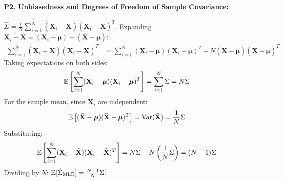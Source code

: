 \paragraph{P2. Unbiasedness and Degrees of Freedom of Sample Covariance:}
$\hat{\Sigma} = \frac{1}{N}\sum_{i=1}^N (\mathbf{X}_i - \bar{\mathbf{X}})(\mathbf{X}_i - \bar{\mathbf{X}})^T$.
Expanding $\mathbf{X}_i - \bar{\mathbf{X}} = (\mathbf{X}_i - \boldsymbol{\mu}) - (\bar{\mathbf{X}} - \boldsymbol{\mu})$:
\begin{align*}
\sum_{i=1}^N (\mathbf{X}_i - \bar{\mathbf{X}})(\mathbf{X}_i - \bar{\mathbf{X}})^T &= \sum_{i=1}^N (\mathbf{X}_i - \boldsymbol{\mu})(\mathbf{X}_i - \boldsymbol{\mu})^T - N(\bar{\mathbf{X}} - \boldsymbol{\mu})(\bar{\mathbf{X}} - \boldsymbol{\mu})^T
\end{align*}
Taking expectations on both sides:
\begin{equation*}
\operatorname{\mathbb{E}}\left[ \sum_{i=1}^N (\mathbf{X}_i - \boldsymbol{\mu})(\mathbf{X}_i - \boldsymbol{\mu})^T \right] = \sum_{i=1}^N \Sigma = N \Sigma
\end{equation*}
For the sample mean, since $\mathbf{X}_i$ are independent:
\begin{equation*}
\operatorname{\mathbb{E}}\left[ (\bar{\mathbf{X}} - \boldsymbol{\mu})(\bar{\mathbf{X}} - \boldsymbol{\mu})^T \right] = \operatorname{Var}(\bar{\mathbf{X}}) = \frac{1}{N}\Sigma
\end{equation*}
Substituting:
\begin{equation*}
\operatorname{\mathbb{E}}\left[ \sum_{i=1}^N (\mathbf{X}_i - \bar{\mathbf{X}})(\mathbf{X}_i - \bar{\mathbf{X}})^T \right] = N\Sigma - N\left(\frac{1}{N}\Sigma\right) = (N - 1)\Sigma
\end{equation*}
Dividing by $N$: $\operatorname{\mathbb{E}}[\hat{\Sigma}_{\text{MLE}}] = \frac{N - 1}{N}\Sigma$.

